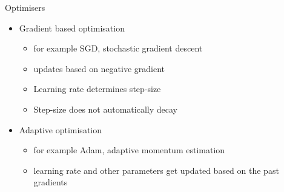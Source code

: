 \documentclass[12pt]{beamer}
\begin{document}
\begin{frame}{Optimisers}
    \begin{itemize}
    \item Gradient based optimisation
        \begin{itemize}
            \item for example SGD, stochastic gradient descent
            \item updates based on negative gradient
            \item Learning rate determines step-size
            \item Step-size does not automatically decay
        \end{itemize}
    \item Adaptive optimisation
        \begin{itemize}
            \item for example Adam, adaptive momentum estimation
            \item learning rate and other parameters get updated based on the past gradients
        \end{itemize}
    \end{itemize}
\end{frame}
\end{document}
